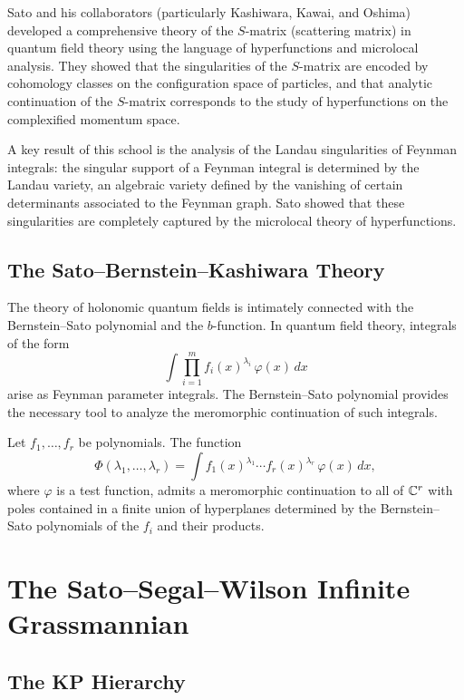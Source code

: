 Sato and his collaborators (particularly Kashiwara, Kawai, and Oshima) developed a comprehensive theory of the \(S\)-matrix (scattering matrix) in quantum field theory using the language of hyperfunctions and microlocal analysis. They showed that the singularities of the \(S\)-matrix are encoded by cohomology classes on the configuration space of particles, and that analytic continuation of the \(S\)-matrix corresponds to the study of hyperfunctions on the complexified momentum space.

A key result of this school is the analysis of the Landau singularities of Feynman integrals: the singular support of a Feynman integral is determined by the Landau variety, an algebraic variety defined by the vanishing of certain determinants associated to the Feynman graph. Sato showed that these singularities are completely captured by the microlocal theory of hyperfunctions.

\subsection{The Sato--Bernstein--Kashiwara Theory}

The theory of holonomic quantum fields is intimately connected with the Bernstein--Sato polynomial and the \(b\)-function. In quantum field theory, integrals of the form
\[
\int \prod_{i=1}^m f_i(x)^{\lambda_i} \, \varphi(x) \, dx
\]
arise as Feynman parameter integrals. The Bernstein--Sato polynomial provides the necessary tool to analyze the meromorphic continuation of such integrals.

\begin{theorem}
Let \(f_1,\dots,f_r\) be polynomials. The function
\[
\Phi(\lambda_1,\dots,\lambda_r) = \int f_1(x)^{\lambda_1} \cdots f_r(x)^{\lambda_r} \, \varphi(x) \, dx,
\]
where \(\varphi\) is a test function, admits a meromorphic continuation to all of \(\mathbb{C}^r\) with poles contained in a finite union of hyperplanes determined by the Bernstein--Sato polynomials of the \(f_i\) and their products.
\end{theorem}

\section{The Sato--Segal--Wilson Infinite Grassmannian}

\subsection{The KP Hierarchy}

